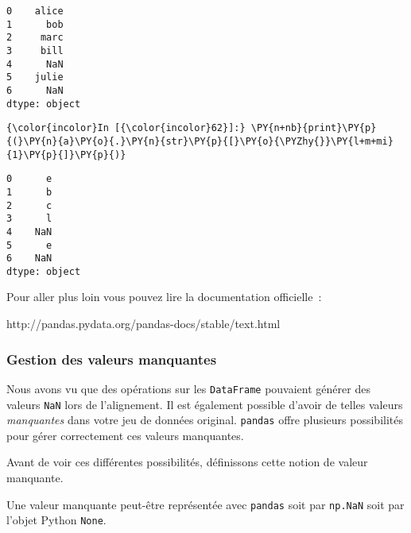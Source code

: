     \begin{Verbatim}[commandchars=\\\{\},frame=single,framerule=0.3mm,rulecolor=\color{cellframecolor}]
0    alice
1      bob
2     marc
3     bill
4      NaN
5    julie
6      NaN
dtype: object
\end{Verbatim}

    \begin{Verbatim}[commandchars=\\\{\},frame=single,framerule=0.3mm,rulecolor=\color{cellframecolor}]
{\color{incolor}In [{\color{incolor}62}]:} \PY{n+nb}{print}\PY{p}{(}\PY{n}{a}\PY{o}{.}\PY{n}{str}\PY{p}{[}\PY{o}{\PYZhy{}}\PY{l+m+mi}{1}\PY{p}{]}\PY{p}{)}
\end{Verbatim}


    \begin{Verbatim}[commandchars=\\\{\},frame=single,framerule=0.3mm,rulecolor=\color{cellframecolor}]
0      e
1      b
2      c
3      l
4    NaN
5      e
6    NaN
dtype: object
\end{Verbatim}

    Pour aller plus loin vous pouvez lire la documentation officielle~:

http://pandas.pydata.org/pandas-docs/stable/text.html

    \hypertarget{gestion-des-valeurs-manquantes}{%
\subsubsection{Gestion des valeurs
manquantes}\label{gestion-des-valeurs-manquantes}}

    Nous avons vu que des opérations sur les \texttt{DataFrame} pouvaient
générer des valeurs \texttt{NaN} lors de l'alignement. Il est également
possible d'avoir de telles valeurs \emph{manquantes} dans votre jeu de
données original. \texttt{pandas} offre plusieurs possibilités pour
gérer correctement ces valeurs manquantes.

    Avant de voir ces différentes possibilités, définissons cette notion de
valeur manquante.

Une valeur manquante peut-être représentée avec \texttt{pandas} soit par
\texttt{np.NaN} soit par l'objet Python \texttt{None}.

